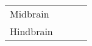 \begin{table}[htbp]
\begin{tabular}{l l l l}
            \multirow{4}{*}{Midbrain}
                                     & \multirow{4}{*}{\underline{\hspace{3cm}}}
                                     & \multirow{4}{*}{\underline{\hspace{3cm}}}
                                     & \underline{\hspace{3cm}}                                                                                             \\
                                     &                                                          &
                                     & \underline{\hspace{3cm}}                                                                                         \\
                                     &                                                          &
                                     & \underline{\hspace{3cm}}                                                                               \\
                                     &                                                          &
                                     & \underline{\hspace{3cm}}                                                                               \\
            \midrule

            \multirow{4}{*}{Hindbrain}
                                     & \multirow{4}{*}{\underline{\hspace{3cm}}}
                                     & \multirow{2}{*}{\underline{\hspace{3cm}}}
                                     & \underline{\hspace{3cm}}                                                                                        \\
                                     &                                                          &
                                     & \underline{\hspace{3cm}}                                                                                               \\[0.5em]
            \cline{3-4}                                                                                                                                         \\[-0.5em]
                                     &                                                          & \underline{\hspace{3cm}}
                                     & \underline{\hspace{3cm}}                                                                                 \\
            \bottomrule
      \end{tabular}
      \label{tab:brain-divisions}
\end{table}
